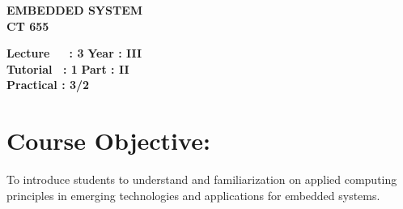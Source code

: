 \begin{center}
    \textbf{\huge{\uppercase{Embedded System}}}
    \\
    \vspace{.5cm}
    \textbf{\large{CT 655}}
\end{center}

\noindent\textbf{Lecture\ \ \ : 3} \hfill \textbf{Year : III} \\
\textbf{Tutorial \ : 1} \hfill \textbf{Part : II } \\
\textbf{Practical : 3/2}  \\

\par
\noindent 
\section*{Course Objective:}
To introduce students to understand and familiarization on applied computing principles in emerging technologies and applications for embedded systems.

